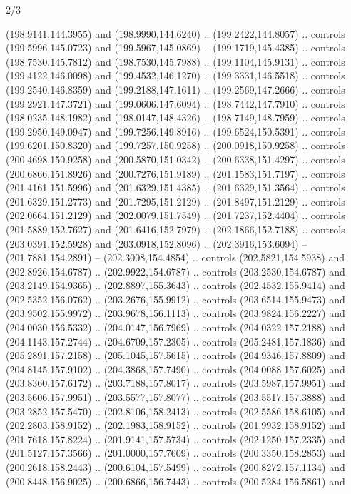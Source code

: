 \begin{flagdescription}{2/3}
\begin{scope}[xshift=0.5\flaglength,yshift=0.5\flagwidth,scale=\flagwidth/180]
\begin{scope}[y=0.8pt, x=0.8pt, yscale=-1,shift={(-168.75,-108.75)}]
  (198.9141,144.3955) and (198.9990,144.6240) .. (199.2422,144.8057) .. controls
  (199.5996,145.0723) and (199.5967,145.0869) .. (199.1719,145.4385) .. controls
  (198.7530,145.7812) and (198.7530,145.7988) .. (199.1104,145.9131) .. controls
  (199.4122,146.0098) and (199.4532,146.1270) .. (199.3331,146.5518) .. controls
  (199.2540,146.8359) and (199.2188,147.1611) .. (199.2569,147.2666) .. controls
  (199.2921,147.3721) and (199.0606,147.6094) .. (198.7442,147.7910) .. controls
  (198.0235,148.1982) and (198.0147,148.4326) .. (198.7149,148.7959) .. controls
  (199.2950,149.0947) and (199.7256,149.8916) .. (199.6524,150.5391) .. controls
  (199.6201,150.8320) and (199.7257,150.9258) .. (200.0918,150.9258) .. controls
  (200.4698,150.9258) and (200.5870,151.0342) .. (200.6338,151.4297) .. controls
  (200.6866,151.8926) and (200.7276,151.9189) .. (201.1583,151.7197) .. controls
  (201.4161,151.5996) and (201.6329,151.4385) .. (201.6329,151.3564) .. controls
  (201.6329,151.2773) and (201.7295,151.2129) .. (201.8497,151.2129) .. controls
  (202.0664,151.2129) and (202.0079,151.7549) .. (201.7237,152.4404) .. controls
  (201.5889,152.7627) and (201.6416,152.7979) .. (202.1866,152.7188) .. controls
  (203.0391,152.5928) and (203.0918,152.8096) .. (202.3916,153.6094) --
  (201.7881,154.2891) -- (202.3008,154.4854) .. controls (202.5821,154.5938) and
  (202.8926,154.6787) .. (202.9922,154.6787) .. controls (203.2530,154.6787) and
  (203.2149,154.9365) .. (202.8897,155.3643) .. controls (202.4532,155.9414) and
  (202.5352,156.0762) .. (203.2676,155.9912) .. controls (203.6514,155.9473) and
  (203.9502,155.9972) .. (203.9678,156.1113) .. controls (203.9824,156.2227) and
  (204.0030,156.5332) .. (204.0147,156.7969) .. controls (204.0322,157.2188) and
  (204.1143,157.2744) .. (204.6709,157.2305) .. controls (205.2481,157.1836) and
  (205.2891,157.2158) .. (205.1045,157.5615) .. controls (204.9346,157.8809) and
  (204.8145,157.9102) .. (204.3868,157.7490) .. controls (204.0088,157.6025) and
  (203.8360,157.6172) .. (203.7188,157.8017) .. controls (203.5987,157.9951) and
  (203.5606,157.9951) .. (203.5577,157.8077) .. controls (203.5517,157.3888) and
  (203.2852,157.5470) .. (202.8106,158.2413) .. controls (202.5586,158.6105) and
  (202.2803,158.9152) .. (202.1983,158.9152) .. controls (201.9932,158.9152) and
  (201.7618,157.8224) .. (201.9141,157.5734) .. controls (202.1250,157.2335) and
  (201.5127,157.3566) .. (201.0000,157.7609) .. controls (200.3350,158.2853) and
  (200.2618,158.2443) .. (200.6104,157.5499) .. controls (200.8272,157.1134) and
  (200.8448,156.9025) .. (200.6866,156.7443) .. controls (200.5284,156.5861) and

\end{scope}
\end{scope}
\end{flagdescription}
